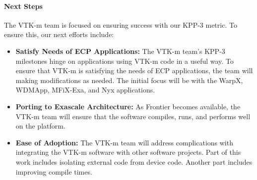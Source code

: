 \paragraph{Next Steps}
The VTK-m team is focused on ensuring success with our KPP-3 metric.
To ensure this, our next efforts include:

\begin{itemize}
\item \textbf{Satisfy Needs of ECP Applications:}
  The VTK-m team's KPP-3 milestones hinge on applications using VTK-m code in a useful way.
  To ensure that VTK-m is satisfying the needs of ECP applications, the team will making modifications as needed.
  The initial focus will be with the WarpX, WDMApp, MFiX-Exa, and Nyx applications.
\item \textbf{Porting to Exascale Architecture:}
  As Frontier becomes available, the VTK-m team will ensure that the software compiles, runs, and performs well on the platform.
\item \textbf{Ease of Adoption:}
  The VTK-m team will address complications with integrating the VTK-m software with other software projects.
  Part of this work includes isolating external code from device code.
  Another part includes improving compile times.
\end{itemize}
